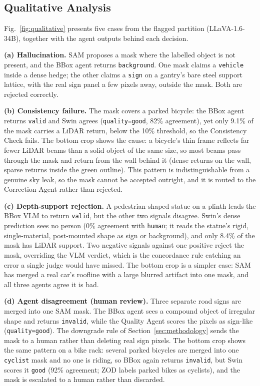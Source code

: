 \documentclass[conference]{IEEEtran}
\begin{document}
\subsection{Qualitative Analysis}

Fig.~\ref{fig:qualitative} presents five cases from the flagged partition (LLaVA-1.6-34B), together with the agent outputs behind each decision.

\textbf{(a) Hallucination.} SAM proposes a mask where the labelled object is not present, and the BBox agent returns \texttt{background}. One mask claims a \texttt{vehicle} inside a dense hedge; the other claims a \texttt{sign} on a gantry's bare steel support lattice, with the real sign panel a few pixels away, outside the mask. Both are rejected correctly.

\textbf{(b) Consistency failure.} The mask covers a parked bicycle: the BBox agent returns \texttt{valid} and Swin agrees (\texttt{quality=good}, 82\% agreement), yet only 9.1\% of the mask carries a LiDAR return, below the 10\% threshold, so the Consistency Check fails. The bottom crop shows the cause: a bicycle's thin frame reflects far fewer LiDAR beams than a solid object of the same size, so most beams pass through the mask and return from the wall behind it (dense returns on the wall, sparse returns inside the green outline). This pattern is indistinguishable from a genuine sky leak, so the mask cannot be accepted outright, and it is routed to the Correction Agent rather than rejected.

\textbf{(c) Depth-support rejection.} A pedestrian-shaped statue on a plinth leads the BBox VLM to return \texttt{valid}, but the other two signals disagree. Swin's dense prediction sees no person (0\% agreement with \texttt{human}; it reads the statue's rigid, single-material, post-mounted shape as sign or background), and only 8.4\% of the mask has LiDAR support. Two negative signals against one positive reject the mask, overriding the VLM verdict, which is the concordance rule catching an error a single judge would have missed. The bottom crop is a simpler case: SAM has merged a real car's roofline with a large blurred artifact into one mask, and all three agents agree it is bad.

\textbf{(d) Agent disagreement (human review).} Three separate road signs are merged into one SAM mask. The BBox agent sees a compound object of irregular shape and returns \texttt{invalid}, while the Quality Agent scores the pixels as sign-like (\texttt{quality=good}). The downgrade rule of Section~\ref{sec:methodology} sends the mask to a human rather than deleting real sign pixels. The bottom crop shows the same pattern on a bike rack: several parked bicycles are merged into one \texttt{cyclist} mask and no one is riding, so BBox again returns \texttt{invalid}, but Swin scores it \texttt{good} (92\% agreement; ZOD labels parked bikes as cyclists), and the mask is escalated to a human rather than discarded.
\end{document}
